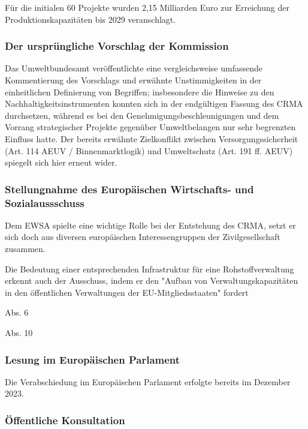 \documentclass[12pt,a4paper,oneside]{book} %
\begin{document}
Für die initialen 60 Projekte wurden 2,15 Milliarden Euro zur Erreichung der Produktionskapazitäten bis 2029 veranschlagt.\autocite{COM(2025) 945 final, S. 4}


\subsubsection{Der ursprüngliche Vorschlag der Kommission}


Das Umweltbundesamt veröffentlichte eine vergleichsweise umfassende Kommentierung des Vorschlags\autocite{https://www.umweltbundesamt.de/publikationen/ensuring-a-secure-sustainable-supply-of-critical} und erwähnte Unstimmigkeiten in der einheitlichen Definierung von Begriffen; insbesondere die Hinweise zu den Nachhaltigkeitsinstrumenten konnten sich in der endgültigen Fassung des CRMA durchsetzen, während es bei den Genehmigungsbeschleunigungen und dem Vorrang strategischer Projekte gegenüber Umweltbelangen nur sehr begrenzten Einfluss hatte. Der bereits erwähnte Zielkonflikt zwischen Versorgungssicherheit (Art. 114 AEUV / Binnenmarktlogik) und Umweltschutz (Art. 191 ff. AEUV) spiegelt sich hier erneut wider.

\subsubsection{Stellungnahme des Europäischen Wirtschafts- und Sozialaussschuss}

Dem EWSA spielte eine wichtige Rolle bei der Entstehung des CRMA, setzt er sich doch aus diversen europäischen Interessengruppen der Zivilgesellschaft zusammen.\autocite{Frenz 2025, S. 1080}

Die Bedeutung einer entsprechenden Infrastruktur für eine Rohstoffverwaltung erkennt auch der Ausschuss, indem er den "Aufbau von Verwaltungskapazitäten in den öffentlichen Verwaltungen der EU-Mitgliedsstaaten" fordert %

Abs. 6

Abs. 10

\subsubsection{Lesung im Europäischen Parlament}


Die Verabschiedung im Europäischen Parlament erfolgte bereits im Dezember 2023.


\subsubsection{Öffentliche Konsultation}
\end{document}

